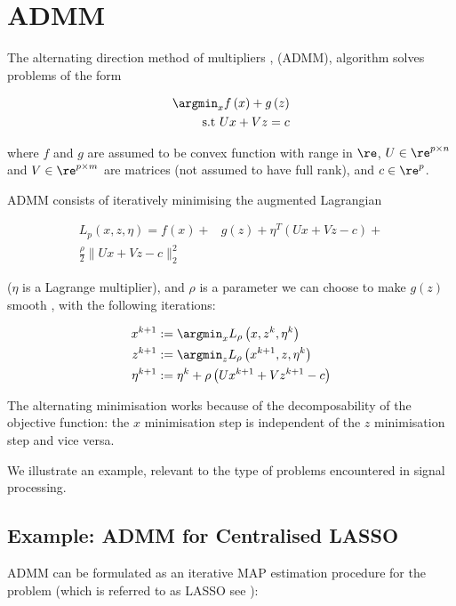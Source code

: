 \section{ADMM }\label{sec:admm}
The alternating direction method of multipliers \cite{Boyd2010a}, (ADMM), algorithm solves problems of the form

\begin{align}
\argmin_{x} f\left( x \right) + g\left(z\right) \nonumber
\\
\text{s.t } Ux +Vz = c
\label{admm}
\end{align}

where \(f\) and \(g\) are assumed to be convex function with range in \(\re\), \(U \in \re^{p \times n}\) and \(V\in \re^{p \times m}\) are matrices (not assumed to have full rank), and \(c \in \re^p\).

ADMM consists of iteratively minimising the augmented Lagrangian 

\begin{align*}
L_p\left(x, z, \eta\right) = f\left( x\right) +& g\left(z\right)+\eta^T\left(Ux+Vz-c\right) + \\ \frac{\rho}{2}\|Ux+Vz-c\|_2^2
\label{admm_form}
\end{align*}

(\(\eta\) is a Lagrange multiplier), and \(\rho\) is a parameter we can choose to make \(g(z)\) smooth \cite{nesterov2005smooth}, with the following iterations:

\begin{align}
x^{k+1} &:= \argmin_{x} L_\rho\left(x,z^k,\eta^k\right)\\
z^{k+1} &:= \argmin_{z} L_\rho\left(x^{k+1},z,\eta^k\right)\\
\eta^{k+1} &:= \eta^{k} + \rho \left(Ux^{k+1} + Vz^{k+1} - c\right)
\label{admm_algo}
\end{align}

The alternating minimisation works because of the decomposability of the objective function: the \(x\) minimisation step is independent of the \(z\) minimisation step and vice versa.  

We illustrate an example, relevant to the type of problems encountered in signal processing.

\subsection{Example: ADMM for Centralised LASSO}
ADMM can be formulated as an iterative MAP estimation procedure for the problem (which is referred to as LASSO see \cite{tibshirani1996regression}):

